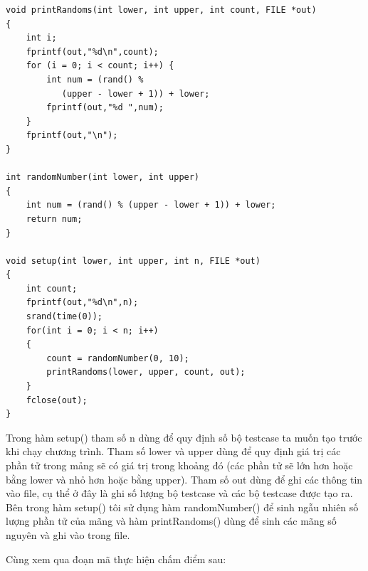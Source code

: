 \documentclass[12pt,a4paper]{article}
\begin{document}
\begin{lstlisting}
void printRandoms(int lower, int upper, int count, FILE *out) 
{ 
    int i;
    fprintf(out,"%d\n",count);
    for (i = 0; i < count; i++) { 
        int num = (rand() % 
           (upper - lower + 1)) + lower; 
        fprintf(out,"%d ",num); 
    }
    fprintf(out,"\n"); 
} 

int randomNumber(int lower, int upper)
{
    int num = (rand() % (upper - lower + 1)) + lower; 
    return num;
}

void setup(int lower, int upper, int n, FILE *out)
{
    int count;
    fprintf(out,"%d\n",n);
    srand(time(0)); 
    for(int i = 0; i < n; i++)
    {
        count = randomNumber(0, 10);
        printRandoms(lower, upper, count, out);
    } 
    fclose(out);
}
\end{lstlisting}

Trong hàm setup() tham số n dùng để quy định số bộ testcase ta muốn tạo trước khi chạy chương trình. Tham số lower và upper dùng để quy định giá trị các phần tử trong mảng sẽ có giá trị trong khoảng đó (các phần tử sẽ lớn hơn hoặc bằng lower và nhỏ hơn hoặc bằng upper). Tham số out dùng để ghi các thông tin vào file, cụ thể ở đây là ghi số lượng bộ testcase và các bộ testcase được tạo ra. Bên trong hàm setup() tôi sử dụng hàm randomNumber() để sinh ngẫu nhiên số lượng phần tử của mãng và hàm printRandoms() dùng để sinh các mãng số nguyên và ghi vào trong file.

Cùng xem qua đoạn mã thực hiện chấm điểm sau:
\end{document}
